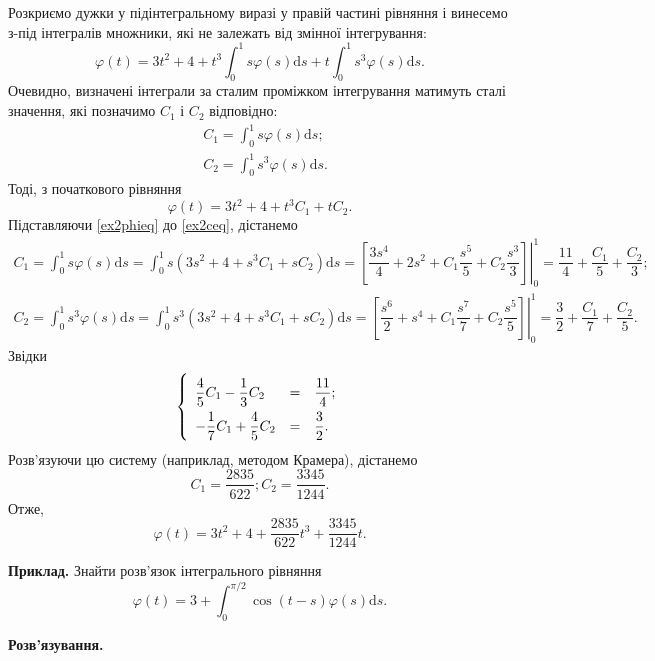 \documentclass[14pt,twoside]{extreport}
\theoremstyle{mystyle}
\numberwithin{equation}{chapter}
\begin{document}
\begin{small}
Розкриємо дужки у підінтегральному виразі у правій частині рівняння і винесемо з-під інтегралів множники, які не залежать від змінної інтегрування:
\[
 \varphi(t) = 3t^2 + 4 + t^3 \int_{0}^{1} s \varphi(s) \mathrm{d}s + t \int_{0}^{1} s^3 \varphi(s) \mathrm{d}s.
\]
Очевидно, визначені інтеграли за сталим проміжком інтегрування матимуть сталі значення, які позначимо $C_1$ і $C_2$ відповідно:
\begin{align}\label{ex2ceq}
  &C_1 = \displaystyle\int_{0}^{1} s \varphi(s) \mathrm{d}s;\\
  &C_2 = \displaystyle\int_{0}^{1} s^3 \varphi(s) \mathrm{d}s.
\end{align}
Тоді, з початкового рівняння
\begin{equation}\label{ex2phieq}
 \varphi(t) = 3t^2 + 4 + t^3 C_1 + t C_2.
\end{equation}
Підставляючи \eqref{ex2phieq} до \eqref{ex2ceq}, дістанемо
\begin{align*}
  C_1 = \displaystyle\int_{0}^{1} s \varphi(s) \mathrm{d}s = \int_{0}^{1} s \left(3s^2 + 4 + s^3 C_1 + s C_2\right) \mathrm{d}s = \left.\left[\dfrac{3s^4}{4} + 2 s^2 + C_1 \dfrac{s^5}{5} + C_2\dfrac{s^3}{3}\right]\right|_{0}^{1} = \dfrac{11}{4} + \dfrac{C_1}{5} + \dfrac{C_2}{3};\\
  C_2 = \displaystyle\int_{0}^{1} s^3 \varphi(s) \mathrm{d}s = \int_{0}^{1} s^3 \left(3s^2 + 4 + s^3 C_1 + s C_2\right) \mathrm{d}s = \left.\left[\dfrac{s^6}{2} + s^4 + C_1 \dfrac{s^7}{7} + C_2\dfrac{s^5}{5}\right]\right|_{0}^{1} = \dfrac{3}{2} + \dfrac{C_1}{7} + \dfrac{C_2}{5}.
\end{align*}
Звідки
\[
 \left\{
 \renewcommand{\arraystretch}{2.}
 \begin{array}{lll}
 \dfrac{4}{5}C_1 -\dfrac{1}{3}C_2 &=& \dfrac{11}{4};\\
 -\dfrac{1}{7}C_1 +\dfrac{4}{5}C_2 &=& \dfrac{3}{2}.\\
 \end{array}
 \right.
\]
Розв'язуючи цю систему (наприклад, методом Крамера), дістанемо
\[
C_1=\dfrac{2835}{622}; C_2= \dfrac{3345}{1244}.
\]
Отже,
\[
 \varphi(t) = 3t^2 + 4 + \dfrac{2835}{622} t^3 + \dfrac{3345}{1244}t.
\]

\textbf{Приклад.} Знайти розв'язок інтегрального рівняння
\[
\varphi(t) = 3 + \int_{0}^{\pi/2} \cos (t-s) \varphi(s) \mathrm{d}s.
\]

\textbf{Розв'язування.}


\end{small}
\end{document}
